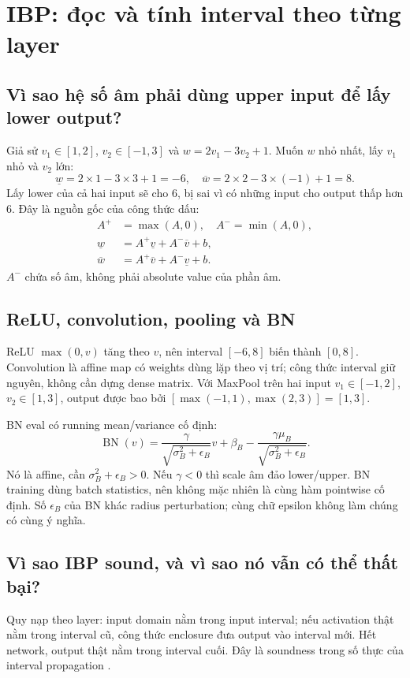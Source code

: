 \documentclass[11pt,a4paper]{article}
\theoremstyle{definition}
\begin{document}
\section{IBP: đọc và tính interval theo từng layer}
\subsection{Vì sao hệ số âm phải dùng upper input để lấy lower output?}
Giả sử $v_1\in[1,2]$, $v_2\in[-1,3]$ và
$w=2v_1-3v_2+1$. Muốn $w$ nhỏ nhất, lấy $v_1$ nhỏ và $v_2$ lớn:
\begin{equation}
\underline w=2\times1-3\times3+1=-6,
\quad
\overline w=2\times2-3\times(-1)+1=8.
\end{equation}
Lấy lower của cả hai input sẽ cho 6, bị sai vì có những input cho output
thấp hơn 6. Đây là nguồn gốc của công thức dấu:
\begin{align}
A^+&=\max(A,0),\quad A^-=\min(A,0),\\
\underline w&=A^+\underline v+A^-\overline v+b,\\
\overline w&=A^+\overline v+A^-\underline v+b.
\end{align}
$A^-$ chứa số âm, không phải absolute value của phần âm.

\subsection{ReLU, convolution, pooling và BN}
ReLU $\max(0,v)$ tăng theo $v$, nên interval $[-6,8]$ biến thành $[0,8]$.
Convolution là affine map có weights dùng lặp theo vị trí; công thức interval
giữ nguyên, không cần dựng dense matrix. Với MaxPool trên hai input
$v_1\in[-1,2]$, $v_2\in[1,3]$, output được bao bởi
$[\max(-1,1),\max(2,3)]=[1,3]$.

BN eval có running mean/variance cố định:
\begin{equation}
\operatorname{BN}(v)=\frac{\gamma}{\sqrt{\sigma_B^2+\epsilon_B}}v+
\beta_B-\frac{\gamma\mu_B}{\sqrt{\sigma_B^2+\epsilon_B}}.
\end{equation}
Nó là affine, cần $\sigma_B^2+\epsilon_B>0$. Nếu $\gamma<0$ thì scale âm
đảo lower/upper. BN training dùng batch statistics, nên không mặc nhiên
là cùng hàm pointwise cố định. Số $\epsilon_B$ của BN khác radius
perturbation; cùng chữ epsilon không làm chúng có cùng ý nghĩa.

\subsection{Vì sao IBP sound, và vì sao nó vẫn có thể thất bại?}
Quy nạp theo layer: input domain nằm trong input interval; nếu activation
thật nằm trong interval cũ, công thức enclosure đưa output vào interval
mới. Hết network, output thật nằm trong interval cuối. Đây là soundness
trong số thực của interval propagation \cite{ibp}.
\end{document}
